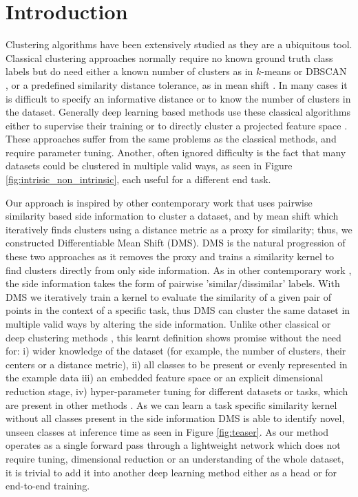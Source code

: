 \documentclass[letterpaper, 11pt]{IEEEtran}
\begin{document}
\section{Introduction}
Clustering algorithms have been extensively studied as they are a ubiquitous tool.  
Classical clustering approaches normally require no known ground truth class labels but do need either a known number of clusters as in $k$-means \cite{Lloyd1982} or DBSCAN \cite{Sander1998}, or  a predefined similarity distance tolerance, as in mean shift \cite{Fukunaga1975}.  
In many cases it is difficult to specify an informative distance or to know the number of clusters in the dataset.
Generally deep learning based methods use these classical algorithms either to supervise their training \cite{Shah2018,shah2018deep} or to directly cluster a projected feature space \cite{Chang2017,Yang2017}. These approaches suffer from the same problems as the classical methods, and require parameter tuning.
Another, often ignored difficulty is the fact that many datasets could be clustered in multiple valid ways, as seen in Figure \ref{fig:intrisic_non_intrinsic}, each useful for a different end task.

Our approach is inspired by other contemporary work \cite{Xing,han2020automatically,Han} that uses pairwise similarity based side information to cluster a dataset, and by mean shift which iteratively finds clusters using a distance metric as a proxy for similarity; thus, we constructed Differentiable Mean Shift (DMS).
DMS is the natural progression of these two approaches as it removes the proxy and trains a similarity kernel to find clusters directly from only side information. As in other contemporary work \cite{Xing,han2020automatically,Han}, the side information takes the form of pairwise 'similar/dissimilar' labels. With DMS we iteratively train a kernel to evaluate the similarity of a given pair of points in the context of a specific task, thus DMS can cluster the same dataset in multiple valid ways by altering the side information.
Unlike other classical or deep clustering methods \cite{Shah2018,shah2018deep,Chang2017,Dizaji2017}, this learnt definition 
shows promise without the need for: i) wider knowledge of the dataset (for example, the number of clusters, their centers or a distance metric), ii) all classes to be present or evenly represented in the example data iii) an embedded feature space or an explicit dimensional reduction stage, iv) hyper-parameter tuning for different datasets or tasks, which are present in other methods \cite{Shah2018,shah2018deep,Chang2017,Dizaji2017,Hsu2015,Liu2015,Ceccarelli2008,Li2018}. 
As we can learn a task specific similarity kernel without all classes present in the side information DMS is able to identify novel, unseen classes at inference time as seen in Figure \ref{fig:teaser}.
As our method operates as a single forward pass through a lightweight network which does not require tuning, dimensional reduction or an understanding of the whole dataset, it is trivial to add it into another deep learning method either as a head or for end-to-end training.
\end{document}
